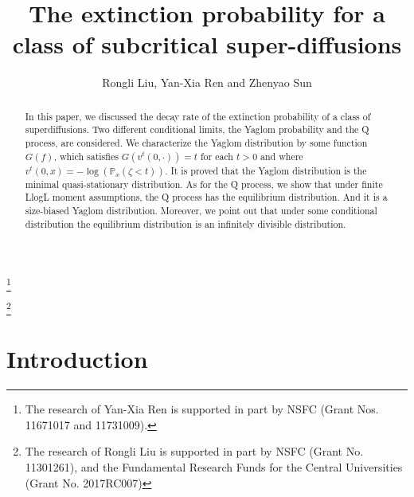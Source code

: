 \documentclass[12pt,a4paper]{amsart}
\numberwithin{equation}{section}
\theoremstyle{plain}
\theoremstyle{definition}
\begin{document}
\title[
  Subcritical super-diffusions]
{\large 
  The extinction probability for a class of subcritical super-diffusions}
\author[
  R. Liu, Y.-X. Ren and Z. Sun]
{
  Rongli Liu, Yan-Xia Ren and Zhenyao Sun}
\address{
  Yan-Xia Ren\\
  School of Mathematical Sciences\\
  Peking University\\
  Beijing, P. R. China, 100871}
\thanks{
  The research of Yan-Xia Ren is supported in part by NSFC (Grant Nos. 11671017  and 11731009).}
\address{
  Rongli Liu\\
  {\bf Information about Rongli Liu}}
\thanks{
  The research of Rongli Liu is supported in part by NSFC
  (Grant No. 11301261), and the Fundamental Research Funds for the Central Universities (Grant No.  2017RC007)}
\address{
  Zhenyao Sun\\
  School of Mathematical Sciences\\
  Peking University\\
  Beijing, P. R. China, 100871}
\begin{abstract}
	In this paper, we discussed the decay rate of the extinction probability of a class of superdiffusions.
  Two different conditional limits, the Yaglom probability and the Q process, are considered.
  We characterize the Yaglom distribution by some function $G(f)$, which satisfies $G(v^t(0,\cdot))=t$ for each $t>0$ and where $v^t(0,x)=-\log(\mathbb P_x(\zeta<t))$.
  It is proved that the Yaglom distribution is the minimal quasi-stationary distribution.
  As for the Q process, we show that under finite LlogL moment assumptions, the Q process has the equilibrium distribution.
  And it is a size-biased Yaglom distribution.
  Moreover, we point out that under some conditional distribution the equilibrium  distribution is an infinitely divisible distribution.
\end{abstract}
\maketitle
\section{Introduction}
\end{document}
